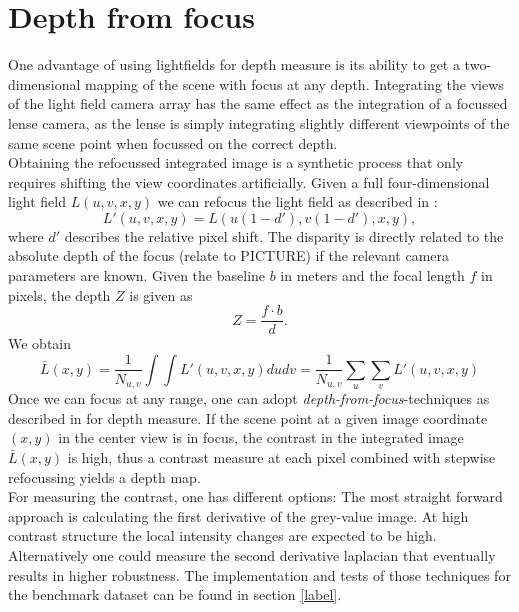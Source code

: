 \documentclass  [
  paper    = a4,
  BCOR     = 10mm,
  twoside,
  fontsize = 12pt,
  fleqn,
  toc      = bibnumbered,
  toc      = listofnumbered,
  numbers  = noendperiod,
  headings = normal,
  listof   = leveldown,
  version  = 3.03
]                                       {scrreprt}
\begin{document}
 
\section{Depth from focus}
\label{sec:theo depth}
One advantage of using lightfields for depth measure is its ability to get a two-dimensional mapping of the scene with focus at any depth. Integrating the views of the light field camera array has the same effect as the integration of a focussed lense camera, as the lense is simply integrating slightly different viewpoints of the same scene point when focussed on the correct depth. \\
 Obtaining the refocussed integrated image is a synthetic process that only requires shifting the view coordinates artificially. Given a full four-dimensional light field $L(u, v, x, y)$ we can refocus the light field as described in \cite{ng2005light}:
 \begin{equation}\label{eq:refocus}
L'(u, v, x, y) = L(u(1-d'), v(1-d'), x, y),
\end{equation}
where $d'$ describes the relative pixel shift. The disparity is directly related to the absolute depth of the focus (relate to PICTURE) if the relevant camera parameters are  known. Given the baseline $b$ in meters and the focal length $f$ in pixels, the depth $Z$ is given as \begin{equation}\label{key}
Z = \frac{f\cdot b}{d}.
\end{equation} 
We obtain
\begin{equation}\label{key}
\bar{L}(x,y) = \frac{1}{N_{u,v}}\int\int L'(u, v, x, y) du  dv =\frac{1}{N_{u,v}}\sum_{u}\sum_{v}  L'(u, v, x, y)
\end{equation}
Once we can focus at any range, one can adopt \textit{depth-from-focus}-techniques as described in \cite{watanabe1998rational} for depth measure. If the scene point at a given image coordinate $(x, y)$ in the center view is in focus, the contrast in the integrated image $\bar{L}(x,y)$ is high, thus a contrast measure at each pixel combined with stepwise refocussing yields a depth map. \\
For measuring the contrast, one has different options: The most straight forward approach is calculating the first derivative of the grey-value image. At high contrast structure the local intensity changes are expected to be high. Alternatively one could measure the second derivative laplacian that eventually results in higher robustness. The implementation and tests of those techniques for the benchmark dataset can be found in section \ref{label}.\\
\end{document}
